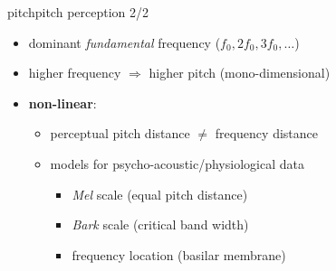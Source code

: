         \begin{frame}{pitch}{pitch perception 2/2}
            \vspace{-2mm}
            \begin{itemize}
                \item	dominant \textit{fundamental} frequency ($f_0,2f_0,3f_0,\ldots$)
                    \vspace{-3mm}

                
                \item<2->	higher frequency $\Rightarrow$ higher pitch (mono-dimensional)

                \item<3->	\textbf{non-linear}:
                    \begin{itemize}
                        \item	perceptual pitch distance $\neq$ frequency distance
                        
                        \item<4->	models for psycho-acoustic/physiological data
                            \begin{itemize}
                                \item	\textit{Mel} scale (equal pitch distance)

                                \item<5->	\textit{Bark} scale (critical band width)

                                \item<6->	frequency location (basilar membrane)
                            \end{itemize}
                    \end{itemize}
            \end{itemize}
        \end{frame}
